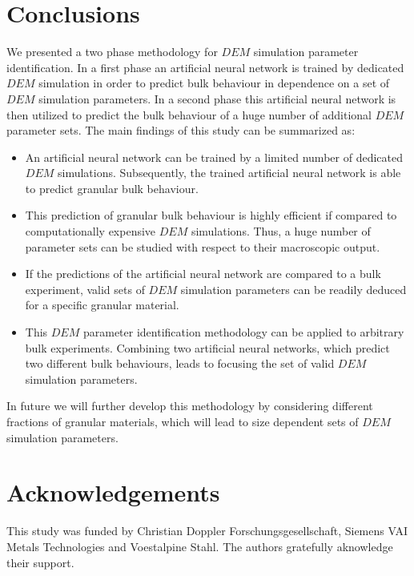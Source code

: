\documentclass[review]{elsarticle}
\begin{document}
\section{Conclusions}
\label{sec:conclusions}
We presented a two phase methodology for $DEM$ simulation parameter
identification. In a first phase an artificial neural network is 
trained by dedicated $DEM$ simulation in order to predict bulk 
behaviour in dependence on a set of $DEM$ simulation parameters. 
In a second phase this artificial neural network is then utilized 
to predict the bulk behaviour of a huge number of additional $DEM$ parameter
sets.
The main findings of this study can be summarized as:
\begin{itemize}
  \item{An artificial neural network can be trained by a limited number of
  dedicated $DEM$ simulations.
  		Subsequently, the trained artificial neural network is able to predict
  		granular bulk behaviour.}
  \item{This prediction of granular bulk behaviour is highly efficient if
  		compared to computationally expensive $DEM$ simulations.
  		Thus, a huge number of parameter sets can be studied with respect to their
  		macroscopic output.}
  \item{If the predictions of the artificial neural network are compared to a bulk experiment, 
  		valid sets of $DEM$ simulation parameters can be readily deduced for a
  		specific granular material.}
  \item{This $DEM$ parameter identification methodology can be applied to
  arbitrary bulk experiments.
  		Combining two artificial neural networks, which predict two different bulk
  		behaviours, leads to focusing the set of valid $DEM$ simulation parameters.}
\end{itemize}
In future we will further develop this methodology by considering different
fractions of granular materials, which will lead to size dependent sets of $DEM$
simulation parameters.

\section{Acknowledgements}
This study was funded by Christian Doppler Forschungsgesellschaft, Siemens VAI Metals Technologies and Voestalpine Stahl. The authors gratefully aknowledge their support.
 

%
\end{document}
